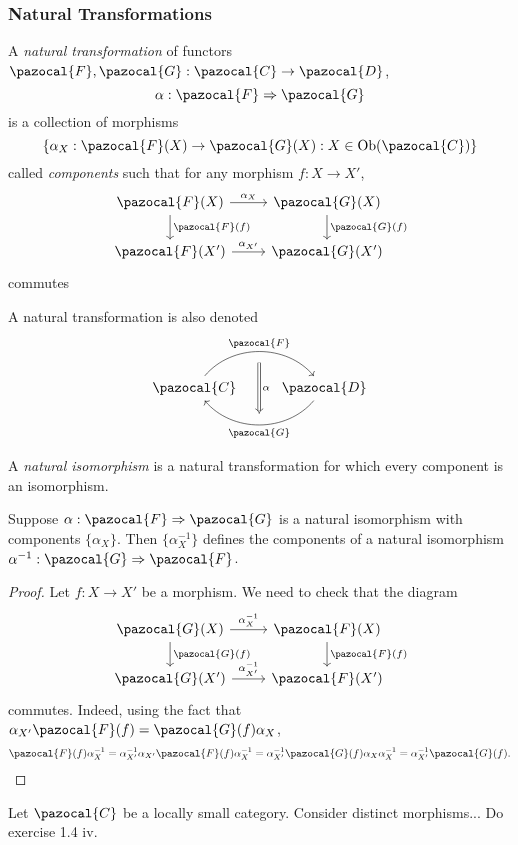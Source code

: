 \subsubsection{Natural Transformations}
\begin{definition}
    A \emph{natural transformation} of functors $\pazocal{F},\pazocal{G} : \pazocal{C}\rightarrow \pazocal{D}$,
    $$\alpha : \pazocal{F} \Rightarrow \pazocal{G}$$
    is a collection of morphisms 
    $$\left\{\alpha_X : \pazocal{F}(X)\rightarrow \pazocal{G}(X) : X\in\Ob(\pazocal{C})\right\} $$
    called \emph{components} such that for any morphism $f: X\rightarrow X'$,
    $$
        \begin{tikzcd}
            \pazocal{F}(X) \arrow[r, "\alpha_X"] \arrow[d,"\pazocal{F}(f)"] & \pazocal{G}(X)\arrow[d,"\pazocal{G}(f)"]\\
            \pazocal{F}(X') \arrow[r,"\alpha_{X'}"] & \pazocal{G}(X')
        \end{tikzcd}
    $$ 
    commutes
\end{definition}
\begin{remark}
    A natural transformation is also denoted 
    $$
        \begin{tikzcd}
            \pazocal{C} \arrow[r,bend left = 50, "\pazocal{F}"{name=F}] & \pazocal{D} \arrow[l, bend left = 50, "\pazocal{G}"{name=G}] \arrow[Rightarrow,from=F, to=G,"\alpha",shorten >=8pt, shorten <=8pt]
        \end{tikzcd}
    $$
\end{remark}
\begin{definition}
    A \emph{natural isomorphism} is a natural transformation for which every component is an isomorphism. 
\end{definition}
\begin{lemma}
    Suppose $\alpha : \pazocal{F}\Rightarrow \pazocal{G}$ is a natural isomorphism with components $\{\alpha_X\}$. Then $\{\alpha_X^{-1}\}$ defines the components of a natural isomorphism $\alpha^{-1} : \pazocal{G} \Rightarrow \pazocal{F}$. 
\end{lemma}
\begin{proof}
    Let $f: X\rightarrow X'$ be a morphism. We need to check that the diagram 
    $$
        \begin{tikzcd}
            \pazocal{G}(X) \arrow[r,"\alpha_X^{-1}"] \arrow[d,"\pazocal{G}(f)"] & \pazocal{F}(X)\arrow[d,"\pazocal{F}(f)"] \\
            \pazocal{G}(X')\arrow[r,"\alpha_{X'}^{-1}"] & \pazocal{F}(X')
        \end{tikzcd}
    $$
    commutes. Indeed, using the fact that $\alpha_{X'}\pazocal{F}(f)= \pazocal{G}(f)\alpha_X$,
    \begin{align*}
        \pazocal{F}(f)\alpha_{X}^{-1} = \alpha_{X'}^{-1}\alpha_{X'}\pazocal{F}(f)\alpha_X^{-1} = \alpha_{X'}^{-1}\pazocal{G}(f)\alpha_X\alpha_X^{-1}= \alpha_{X'}^{-1}\pazocal{G}(f).
    \end{align*}
\end{proof}
\begin{example}
    Let $\pazocal{C}$ be a locally small category. Consider distinct morphisms... {\Large Do exercise 1.4 iv.}
\end{example}
